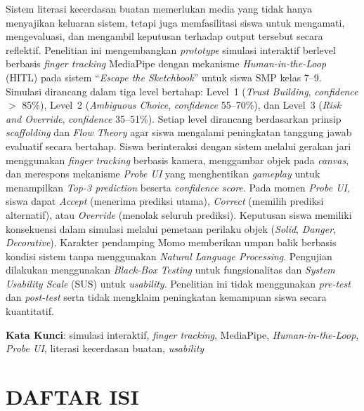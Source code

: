 \documentclass[10pt,twoside,openright]{report}
\newcommand{\blankpage}{%
  \afterpage{%
    \null
    \vfill
    \begin{center}
      {\small Halaman ini sengaja dikosongkan}
    \end{center}
    \vfill
    \thispagestyle{plain}
    \newpage
  }%
}
\begin{document}
Sistem literasi kecerdasan buatan memerlukan media yang tidak hanya menyajikan keluaran sistem, tetapi juga memfasilitasi siswa untuk mengamati, mengevaluasi, dan mengambil keputusan terhadap output tersebut secara reflektif. Penelitian ini mengembangkan \textit{prototype} simulasi interaktif berlevel berbasis \textit{finger tracking} MediaPipe dengan mekanisme \textit{Human-in-the-Loop} (HITL) pada sistem ``\textit{Escape the Sketchbook}'' untuk siswa SMP kelas 7--9. Simulasi dirancang dalam tiga level bertahap: Level~1 (\textit{Trust Building}, \textit{confidence} $>$ 85\%), Level~2 (\textit{Ambiguous Choice}, \textit{confidence} 55--70\%), dan Level~3 (\textit{Risk and Override}, \textit{confidence} 35--51\%). Setiap level dirancang berdasarkan prinsip \textit{scaffolding} dan \textit{Flow Theory} agar siswa mengalami peningkatan tanggung jawab evaluatif secara bertahap. Siswa berinteraksi dengan sistem melalui gerakan jari menggunakan \textit{finger tracking} berbasis kamera, menggambar objek pada \textit{canvas}, dan merespons mekanisme \textit{Probe UI} yang menghentikan \textit{gameplay} untuk menampilkan \textit{Top-3 prediction} beserta \textit{confidence score}. Pada momen \textit{Probe UI}, siswa dapat \textit{Accept} (menerima prediksi utama), \textit{Correct} (memilih prediksi alternatif), atau \textit{Override} (menolak seluruh prediksi). Keputusan siswa memiliki konsekuensi dalam simulasi melalui pemetaan perilaku objek (\textit{Solid}, \textit{Danger}, \textit{Decorative}). Karakter pendamping Momo memberikan umpan balik berbasis kondisi sistem tanpa menggunakan \textit{Natural Language Processing}. Pengujian dilakukan menggunakan \textit{Black-Box Testing} untuk fungsionalitas dan \textit{System Usability Scale} (SUS) untuk \textit{usability}. Penelitian ini tidak menggunakan \textit{pre-test} dan \textit{post-test} serta tidak mengklaim peningkatan kemampuan siswa secara kuantitatif.

\vspace{0.5cm}

\noindent\textbf{Kata Kunci}: simulasi interaktif, \textit{finger tracking}, MediaPipe, \textit{Human-in-the-Loop}, \textit{Probe UI}, literasi kecerdasan buatan, \textit{usability}

\blankpage

\chapter*{DAFTAR ISI}
\end{document}
